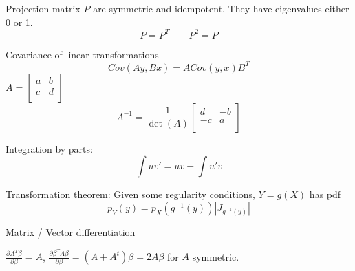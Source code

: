 \documentclass[10pt, twocolumn]{article}
\begin{document}
Projection matrix $P$ are symmetric and idempotent. They have eigenvalues
either 0 or 1.
\[
    P = P^T \qquad P^2 = P
\]

Covariance of linear transformations
\[
    Cov(Ay, Bx) = A Cov(y, x) B^T
\]
$
    A = 
    [\begin{smallmatrix}
        a & b \\
        c & d \\
    \end{smallmatrix}]
$
\[
    A^{-1} = 
    \frac{1}{\det (A)}
    \begin{bmatrix}
        d & -b \\
        -c & a \\
    \end{bmatrix}
\]

Integration by parts:
\[
    \int uv' = uv - \int u'v
\]

Transformation theorem: Given some regularity conditions, $Y = g(X)$ has
pdf
\[
    p_Y(y) = p_X(g^{-1}(y)) |J_{g^{-1}(y)}|
\]

Matrix / Vector differentiation

$\frac{\partial A^T \beta}{\partial \beta} = A$, 
$\frac{\partial \beta^T A \beta}{\partial \beta} = (A + A^t) \beta =
2A\beta$ for $A$ symmetric.
\end{document}
